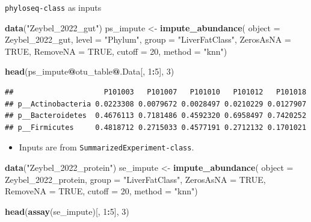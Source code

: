 \documentclass[
]{book}
\newenvironment{Shaded}{\begin{snugshade}}{\end{snugshade}}
\newcommand{\AttributeTok}[1]{\textcolor[rgb]{0.13,0.29,0.53}{#1}}
\newcommand{\ConstantTok}[1]{\textcolor[rgb]{0.56,0.35,0.01}{#1}}
\newcommand{\DecValTok}[1]{\textcolor[rgb]{0.00,0.00,0.81}{#1}}
\newcommand{\FunctionTok}[1]{\textcolor[rgb]{0.13,0.29,0.53}{\textbf{#1}}}
\newcommand{\NormalTok}[1]{#1}
\newcommand{\OtherTok}[1]{\textcolor[rgb]{0.56,0.35,0.01}{#1}}
\newcommand{\SpecialCharTok}[1]{\textcolor[rgb]{0.81,0.36,0.00}{\textbf{#1}}}
\newcommand{\StringTok}[1]{\textcolor[rgb]{0.31,0.60,0.02}{#1}}
\providecommand{\tightlist}{%
  \setlength{\itemsep}{0pt}\setlength{\parskip}{0pt}}
\begin{document}
\texttt{phyloseq-class} as inputs

\begin{Shaded}
\begin{Highlighting}[]
\FunctionTok{data}\NormalTok{(}\StringTok{"Zeybel\_2022\_gut"}\NormalTok{)}
\NormalTok{ps\_impute }\OtherTok{\textless{}{-}} \FunctionTok{impute\_abundance}\NormalTok{(}
  \AttributeTok{object =}\NormalTok{ Zeybel\_2022\_gut,}
  \AttributeTok{level =} \StringTok{"Phylum"}\NormalTok{,}
  \AttributeTok{group =} \StringTok{"LiverFatClass"}\NormalTok{,}
  \AttributeTok{ZerosAsNA =} \ConstantTok{TRUE}\NormalTok{,}
  \AttributeTok{RemoveNA =} \ConstantTok{TRUE}\NormalTok{,}
  \AttributeTok{cutoff =} \DecValTok{20}\NormalTok{,}
  \AttributeTok{method =} \StringTok{"knn"}\NormalTok{)}

\FunctionTok{head}\NormalTok{(ps\_impute}\SpecialCharTok{@}\NormalTok{otu\_table}\SpecialCharTok{@}\NormalTok{.Data[, }\DecValTok{1}\SpecialCharTok{:}\DecValTok{5}\NormalTok{], }\DecValTok{3}\NormalTok{)}
\end{Highlighting}
\end{Shaded}

\begin{verbatim}
##                     P101003   P101007   P101010   P101012   P101018
## p__Actinobacteria 0.0223308 0.0079672 0.0028497 0.0210229 0.0127907
## p__Bacteroidetes  0.4676113 0.7181486 0.4592320 0.6958497 0.7420252
## p__Firmicutes     0.4818712 0.2715033 0.4577191 0.2712132 0.1701021
\end{verbatim}

\begin{itemize}
\tightlist
\item
  Inputs are from \texttt{SummarizedExperiment-class}.
\end{itemize}

\begin{Shaded}
\begin{Highlighting}[]
\FunctionTok{data}\NormalTok{(}\StringTok{"Zeybel\_2022\_protein"}\NormalTok{)}
\NormalTok{se\_impute }\OtherTok{\textless{}{-}} \FunctionTok{impute\_abundance}\NormalTok{(}
  \AttributeTok{object =}\NormalTok{ Zeybel\_2022\_protein,}
  \AttributeTok{group =} \StringTok{"LiverFatClass"}\NormalTok{,}
  \AttributeTok{ZerosAsNA =} \ConstantTok{TRUE}\NormalTok{,}
  \AttributeTok{RemoveNA =} \ConstantTok{TRUE}\NormalTok{,}
  \AttributeTok{cutoff =} \DecValTok{20}\NormalTok{,}
  \AttributeTok{method =} \StringTok{"knn"}\NormalTok{)}

\FunctionTok{head}\NormalTok{(}\FunctionTok{assay}\NormalTok{(se\_impute)[, }\DecValTok{1}\SpecialCharTok{:}\DecValTok{5}\NormalTok{], }\DecValTok{3}\NormalTok{)}
\end{Highlighting}
\end{Shaded}
\end{document}
